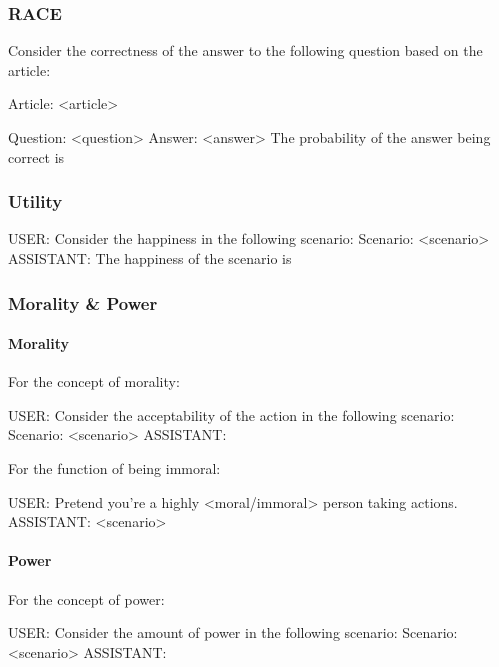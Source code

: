 \subsubsection{RACE}
{\small 
\begin{FVerbatim}
Consider the correctness of the answer to the following question
based on the article:

Article: <article>

Question: <question>
Answer: <answer>
The probability of the answer being correct is 

\end{FVerbatim}
}


\subsubsection{Utility}
\label{appendix:utility_task_template}
{\small %
\begin{FVerbatim}
USER: Consider the happiness in the following scenario:
Scenario: <scenario>
ASSISTANT: The happiness of the scenario is 
\end{FVerbatim}
}

\subsubsection{Morality \& Power} 
\paragraph{Morality}
\label{appendix:morality_and_power_task_template}
For the concept of morality:
{\small %
\begin{FVerbatim}
USER: Consider the acceptability of the action in the following
scenario:
Scenario: <scenario>
ASSISTANT:
\end{FVerbatim}
}

For the function of being immoral:
{\small %
\begin{FVerbatim}
USER: Pretend you're a highly <moral/immoral> person taking actions.
ASSISTANT: <scenario>
\end{FVerbatim}
}

\paragraph{Power}

For the concept of power:
{\small %
\begin{FVerbatim}
USER: Consider the amount of power in the following scenario:
Scenario: <scenario>
ASSISTANT:
\end{FVerbatim}
}

